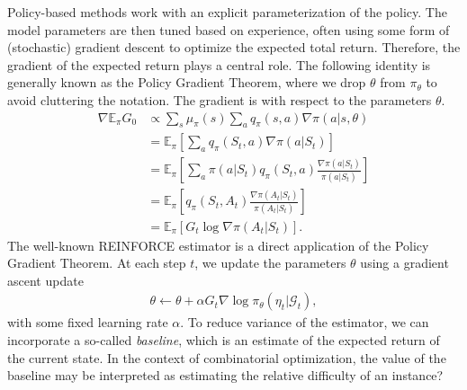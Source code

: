 \documentclass[a4paper]{report}
\theoremstyle{definition}
\theoremstyle{plain}
\begin{document}
Policy-based methods work with an explicit parameterization of the policy. The
model parameters are then tuned based on experience, often using some form of
(stochastic) gradient descent to optimize the expected total return.
%
Therefore, the gradient of the expected return plays a central role. The
following identity is generally known as the Policy Gradient Theorem, where we
drop $\theta$ from $\pi_\theta$ to avoid cluttering the notation. The gradient
is with respect to the parameters $\theta$.
\begin{align*}
  \nabla \mathbb{E}_{\pi} G_{0} &\propto \sum_{s} \mu_{\pi}(s) \sum_{a} q_{\pi}(s, a) \nabla \pi(a | s, \theta) \\
  &= \mathbb{E}_{\pi}\left[ \sum_{a} q_{\pi} (S_{t}, a) \nabla \pi (a | S_{t}) \right] \\
  &= \mathbb{E}_{\pi}\left[ \sum_{a} \pi(a | S_{t}) q_{\pi} (S_{t}, a) \frac{\nabla \pi (a | S_{t})}{\pi (a | S_{t})} \right] \\
  &= \mathbb{E}_{\pi}\left[ q_{\pi} (S_{t}, A_{t}) \frac{\nabla \pi (A_{t} | S_{t})}{\pi (A_{t} | S_{t})} \right] \\
  &= \mathbb{E}_{\pi} \left[ G_{t} \log \nabla \pi (A_{t} | S_{t}) \right] .
\end{align*}
%
The well-known REINFORCE estimator is a direct application of the Policy
Gradient Theorem. At each step $t$, we update the parameters $\theta$ using a
gradient ascent update
\begin{align*}
  \theta \leftarrow \theta + \alpha G_{t} \nabla \log \pi_{\theta}(\eta_{t} | \mathcal{G}_{t}) ,
\end{align*}
with some fixed learning rate $\alpha$.
To reduce variance of the estimator, we can incorporate a so-called
\textit{baseline}, which is an estimate of the expected return of the current
state.
%
In the context of combinatorial optimization, the value of the baseline may be
interpreted as estimating the relative difficulty of an instance?
\end{document}
